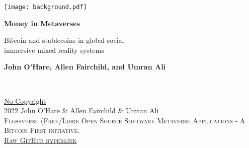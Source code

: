 \documentclass[
	12pt, %
	fleqn, %
	a4paper, %
	oneside, %
]{LegrandOrangeBook}
\begin{document}

\titlepage %
	{\texttt{[image: background.pdf]}} %
	{ %
		\centering\sffamily %
		{\Huge\bfseries Money in Metaverses\par} %
		\vspace{16pt} %
		{\LARGE Bitcoin and stablecoins in global social \\immersive mixed reality systems\par} %
		\vspace{24pt} %
		{\large \textbf{John O'Hare, Allen Fairchild, and Umran Ali}\par} %
	}


\thispagestyle{empty} %

~\vfill %

\noindent \href{https://creativecommons.org/publicdomain/zero/1.0/}{No Copyright}\\ 2022 John O'Hare \& Allen Fairchild \& Umran Ali\\ %

\noindent \textsc{Flossverse (Free/Libre Open Source Software Metaverse Applications - A Bitcoin First initiative.}\\ %

\noindent \textsc{\href{https://raw.githubusercontent.com/Flossverse/Metaverse/main/Paper/metaverseBTC.pdf}{Raw GitHub hyperlink}}\\ %
\end{document}
